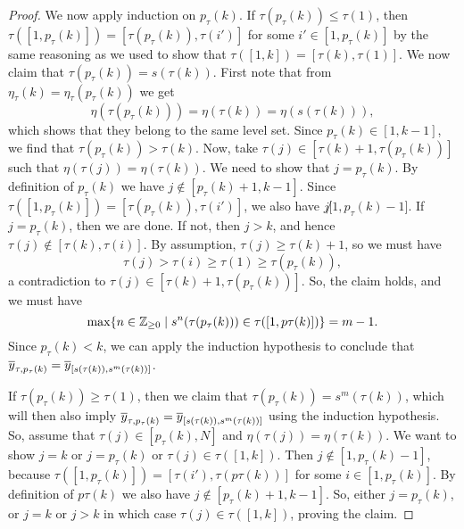 \begin{proof}
	We now apply induction on $p_\tau(k)$. If $\tau(p_\tau(k)) \leq \tau(1)$, then
	$\tau([1, p_\tau(k)]) = [\tau(p_\tau(k)), \tau(i')]$ for some $i' \in [1, p_\tau(k)]$
	by the same reasoning as we used to show that $\tau([1, k]) = [\tau(k), \tau(1)]$. We
	now claim that $\tau(p_\tau(k)) = s(\tau(k))$. First note that from $\eta_\tau (k) =
		\eta_\tau(p_{\tau}(k))$ we get
	\begin{equation*}
		\eta(\tau(p_\tau(k))) = \eta(\tau(k)) = \eta(s(\tau(k))),
	\end{equation*}
	which shows that they belong to the same level set. Since $p_\tau(k) \in [1, k-1]$, we
	find that $\tau(p_\tau(k)) > \tau(k)$. Now, take $\tau(j) \in [\tau(k) + 1,
			\tau(p_\tau(k))]$ such that $\eta(\tau(j)) = \eta(\tau(k))$. We need to show that $j =
		p_\tau(k)$. By definition of $p_\tau(k)$ we have $j \notin [p_\tau(k) + 1, k-1]$. Since
	$\tau([1, p_\tau(k)]) = [\tau(p_\tau(k)), \tau(i')]$, we also have $j \not [1,
			p_\tau(k) - 1]$. If $j = p_\tau(k)$, then we are done. If not, then $j > k$, and hence
	$\tau(j) \notin [\tau(k), \tau(i)]$. By assumption, $\tau(j) \geq \tau(k) + 1$, so we
	must have
	\begin{equation*}
		\tau(j) > \tau(i) \geq \tau(1) \geq \tau(p_\tau(k)),
	\end{equation*}
	a contradiction to $\tau(j) \in [\tau(k) + 1, \tau(p_\tau(k))]$. So, the claim holds, and we must have
	\begin{equation*}
		\max\{n \in \mathbb{Z}_{\geq 0} \mid s^n(\tau(p_\tau(k))) \in \tau([1, p\tau(k)])\} = m-1.
	\end{equation*}
	Since $p_\tau(k) < k$, we can apply the induction hypothesis to conclude that
	$\overline{y}_{\tau, p_\tau(k)} = \overline{y}_{[s(\tau(k)), s^m(\tau(k))]}$.

	If $\tau(p_\tau(k)) \geq \tau(1)$, then we claim that $\tau(p_\tau(k)) = s^m(\tau(k))$,
	which will then also imply $\overline{y}_{\tau, p_\tau(k)} = \overline{y}_{[s(\tau(k)), s^m(\tau(k))]}$
	using the induction hypothesis. So, assume that $\tau(j) \in [p_\tau(k), N]$ and
	$\eta(\tau(j)) = \eta(\tau(k))$. We want to show $j=k$ or $j = p_\tau(k)$ or $\tau(j)
		\in \tau([1, k])$. Then $j \notin [1, p_\tau(k) - 1]$, because $\tau([1, p_\tau(k)]) =
		[\tau(i'), \tau(p\tau(k))]$ for some $i \in [1, p_\tau(k)]$. By definition of
	$p\tau(k)$ we also have $j \notin [p_\tau(k) + 1, k -1]$. So, either $j = p_\tau(k)$,
	or $j = k$ or $j > k$ in which case $\tau(j) \in \tau([1, k])$, proving the claim.


\end{proof}
